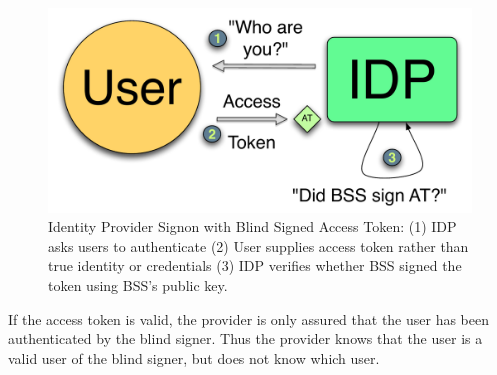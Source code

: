 \documentclass{llncs}
\begin{document}
\begin{figure}
  \centering
  \includegraphics[scale=0.6]{figs/fig-bss-signon-color.pdf}
  \caption{Identity Provider Signon with Blind Signed Access Token: (1) IDP asks
  users to authenticate (2) User supplies access token rather than true identity
  or credentials (3) IDP verifies whether BSS signed the token using BSS's
  public key.}
  \label{fig:bss-signon}
\end{figure}

If the access token is valid, the provider is only assured that the user has been authenticated by the blind signer. Thus the provider knows that the user is a valid user of the blind signer, but does not know which user.
\end{document}
